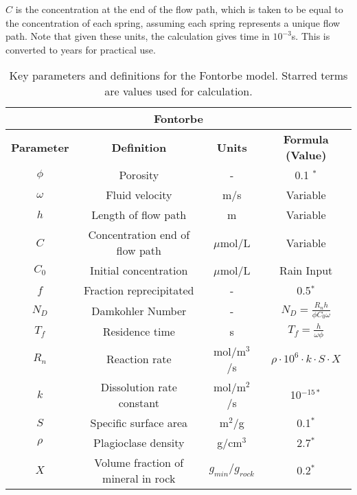 \begin{tcolorbox}
{\begin{multicols}{2}
\end{multicols}
    
$C$ is the concentration at the end of the flow path, which is taken to be equal to the concentration of each spring, assuming each spring represents a unique flow path. Note that given these units, the calculation gives time in \( 10^{-3} \)s. This is converted to years for practical use.\\

\begin{table}[H]
    \centering
    \begin{tabular}{|c|c|c|c|}
        \hline
        \multicolumn{4}{|c|}{\textbf{Fontorbe}} \\  
        \hline
        \textbf{Parameter} & \textbf{Definition} & \textbf{Units} & \textbf{Formula (Value)} \\  
        \hline
        $\phi$ & Porosity & - & 0.1 $^*$\\
        $\omega$ & Fluid velocity & m/s & Variable \\
        $h$ & Length of flow path & m & Variable \\
        $C$ & Concentration \@ end of flow path & $\mu$mol/L & Variable \\
        $C_0$ & Initial concentration & $\mu$mol/L & Rain Input \\
        $f$ & Fraction reprecipitated & - & 0.5$^*$ \\
        $N_D$ & Damkohler Number & - & $N_D = \frac{R_n h}{\phi C_0 \omega}$ \\
        $T_f$ & Residence time & s & $T_f = \frac{h}{\omega\phi}$ \\
        $R_n$ & Reaction rate & mol/m$^3$/s & $\rho \cdot 10^6 \cdot k \cdot S \cdot X $ \\
        $k$ & Dissolution rate constant & mol/m$^2$/s & 10$^{-15*}$ \\
        $S$ & Specific surface area & m$^2$/g & 0.1$^*$ \\
        $\rho$ & Plagioclase density & g/cm$^3$ & 2.7$^*$ \\
        $X$ & Volume fraction of mineral in rock & $g_{min}/g_{rock}$ & 0.2$^*$ \\
        \hline
    \end{tabular}
    \caption{Key parameters and definitions for the Fontorbe model. Starred terms are values used for calculation.}
    \label{tab:parameters3}
\end{table}
    
}

\end{tcolorbox}


